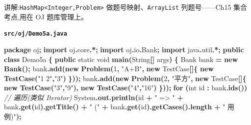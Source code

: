 \documentclass[
  11pt,
]{ctexart}
\newenvironment{Shaded}{\begin{snugshade}}{\end{snugshade}}
\newcommand{\BuiltInTok}[1]{#1}
\newcommand{\CommentTok}[1]{\textcolor[rgb]{0.56,0.35,0.01}{\textit{#1}}}
\newcommand{\ControlFlowTok}[1]{\textcolor[rgb]{0.13,0.29,0.53}{\textbf{#1}}}
\newcommand{\DataTypeTok}[1]{\textcolor[rgb]{0.13,0.29,0.53}{#1}}
\newcommand{\DecValTok}[1]{\textcolor[rgb]{0.00,0.00,0.81}{#1}}
\newcommand{\FunctionTok}[1]{\textcolor[rgb]{0.13,0.29,0.53}{\textbf{#1}}}
\newcommand{\ImportTok}[1]{#1}
\newcommand{\KeywordTok}[1]{\textcolor[rgb]{0.13,0.29,0.53}{\textbf{#1}}}
\newcommand{\NormalTok}[1]{#1}
\newcommand{\OperatorTok}[1]{\textcolor[rgb]{0.81,0.36,0.00}{\textbf{#1}}}
\newcommand{\StringTok}[1]{\textcolor[rgb]{0.31,0.60,0.02}{#1}}
\begin{document}
讲解:\texttt{HashMap\textless{}Integer,Problem\textgreater{}}
做题号映射、\texttt{ArrayList} 列题号------Ch15 集合考点,用在 OJ
题库管理上。

\textbf{\texttt{src/oj/Demo5a.java}}

\begin{Shaded}
\begin{Highlighting}[]
\KeywordTok{package}\ImportTok{ oj}\OperatorTok{;}
\KeywordTok{import} \ImportTok{oj}\OperatorTok{.}\ImportTok{core}\OperatorTok{.*;}
\KeywordTok{import} \ImportTok{oj}\OperatorTok{.}\ImportTok{io}\OperatorTok{.}\ImportTok{Bank}\OperatorTok{;}
\KeywordTok{import} \ImportTok{java}\OperatorTok{.}\ImportTok{util}\OperatorTok{.*;}
\KeywordTok{public} \KeywordTok{class}\NormalTok{ Demo5a }\OperatorTok{\{}
    \KeywordTok{public} \DataTypeTok{static} \DataTypeTok{void} \FunctionTok{main}\OperatorTok{(}\BuiltInTok{String}\OperatorTok{[]}\NormalTok{ args}\OperatorTok{)} \OperatorTok{\{}
\NormalTok{        Bank bank }\OperatorTok{=} \KeywordTok{new} \FunctionTok{Bank}\OperatorTok{();}
\NormalTok{        bank}\OperatorTok{.}\FunctionTok{add}\OperatorTok{(}\KeywordTok{new} \FunctionTok{Problem}\OperatorTok{(}\DecValTok{1}\OperatorTok{,} \StringTok{"A+B"}\OperatorTok{,} \KeywordTok{new}\NormalTok{ TestCase}\OperatorTok{[]\{} \KeywordTok{new} \FunctionTok{TestCase}\OperatorTok{(}\StringTok{"1 2"}\OperatorTok{,}\StringTok{"3"}\OperatorTok{)} \OperatorTok{\}));}
\NormalTok{        bank}\OperatorTok{.}\FunctionTok{add}\OperatorTok{(}\KeywordTok{new} \FunctionTok{Problem}\OperatorTok{(}\DecValTok{2}\OperatorTok{,} \StringTok{"平方"}\OperatorTok{,} \KeywordTok{new}\NormalTok{ TestCase}\OperatorTok{[]\{} \KeywordTok{new} \FunctionTok{TestCase}\OperatorTok{(}\StringTok{"3"}\OperatorTok{,}\StringTok{"9"}\OperatorTok{),} \KeywordTok{new} \FunctionTok{TestCase}\OperatorTok{(}\StringTok{"4"}\OperatorTok{,}\StringTok{"16"}\OperatorTok{)} \OperatorTok{\}));}
        \ControlFlowTok{for} \OperatorTok{(}\DataTypeTok{int}\NormalTok{ id }\OperatorTok{:}\NormalTok{ bank}\OperatorTok{.}\FunctionTok{ids}\OperatorTok{())}                                  \CommentTok{// 遍历(类似 Iterator)}
            \BuiltInTok{System}\OperatorTok{.}\FunctionTok{out}\OperatorTok{.}\FunctionTok{println}\OperatorTok{(}\NormalTok{id }\OperatorTok{+} \StringTok{" =\textgreater{} "} \OperatorTok{+}\NormalTok{ bank}\OperatorTok{.}\FunctionTok{get}\OperatorTok{(}\NormalTok{id}\OperatorTok{).}\FunctionTok{getTitle}\OperatorTok{()} \OperatorTok{+} \StringTok{" ("} \OperatorTok{+}\NormalTok{ bank}\OperatorTok{.}\FunctionTok{get}\OperatorTok{(}\NormalTok{id}\OperatorTok{).}\FunctionTok{getCases}\OperatorTok{().}\FunctionTok{length} \OperatorTok{+} \StringTok{" 用例)"}\OperatorTok{);}

\end{Highlighting}
\end{Shaded}
\end{document}
